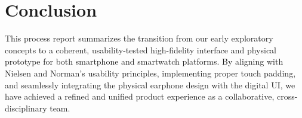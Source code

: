\documentclass[12pt, a4paper]{report}
\begin{document}
\chapter{Conclusion}
This process report summarizes the transition from our early exploratory concepts to a coherent, usability-tested high-fidelity interface and physical prototype for both smartphone and smartwatch platforms. By aligning with Nielsen and Norman's usability principles, implementing proper touch padding, and seamlessly integrating the physical earphone design with the digital UI, we have achieved a refined and unified product experience as a collaborative, cross-disciplinary team.

\end{document}
